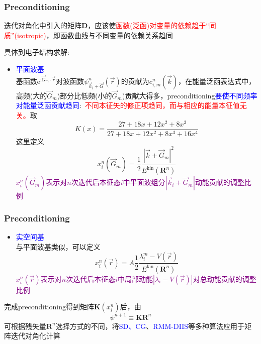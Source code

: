 \documentclass[cjk,slidestop,compress,mathserif,blue]{beamer}
\begin{document}
\frame
{
	\frametitle{\textrm{Preconditioning}}
	迭代对角化中引入的矩阵$\mathbf{D}$，应该使\textcolor{red}{函数(泛函)对变量的依赖趋于“同质”(\textrm{isotropic})}，即函数曲线与不同变量的依赖关系趋同

	具体到电子结构求解:~
	\begin{itemize}
		\item \textcolor{blue}{平面波基}\\
			基函数$\mathrm{e}^{\mathrm{i}\vec G_m\cdot\vec r}$对波函数$\psi_{\vec k_i+\vec G}^n(\vec r)$的贡献为$c_{i,m}^n(\vec k)$，在能量泛函表达式中，高频(大的$\vec G_m$)部分比低频(小的$\vec G_m$)贡献大得多，\textrm{preconditioning}\textcolor{blue}{要使不同频率对能量泛函贡献趋同}:~\textcolor{red}{不同本征矢的修正项趋同，而与相应的能量本征值无关。}取
	\begin{displaymath}
		K(x)=\dfrac{27+18x+12x^2+8x^3}{27+18x+12x^2+8x^3+16x^4}
	\end{displaymath}
	这里定义
	\begin{displaymath}
		x_i^n(\vec G_m)=\dfrac12\dfrac{|\vec k+\vec G_m|^2}{E^{\mathrm{kin}}(\mathbf{R}^n)}
	\end{displaymath}
	\textcolor{purple}{$x_i^n(\vec G_m)$表示对$n$次迭代后本征态$i$中平面波组分$|\vec k_i+\vec G_m|$动能贡献的调整比例}
	\end{itemize}
}

\frame
{
	\frametitle{\textrm{Preconditioning}}
	\begin{itemize}
		\item \textcolor{blue}{实空间基}\\
		与平面波基类似，可以定义
	\begin{displaymath}
		x_i^n(\vec r)=A\dfrac12\dfrac{\lambda_i^m-V(\vec r)}{E^{\mathrm{kin}}(\mathbf{R}^n)}
	\end{displaymath}
		\textcolor{purple}{$x_i^n(\vec r)$表示对$n$次迭代后本征态$i$中局部动能$|\lambda_i-V(\vec r)|$对总动能贡献的调整比例}
	\end{itemize}
	完成\textrm{preconditioning}得到矩阵$\mathbf{K}(x_i^n)$后，由
	\begin{displaymath}
		\psi^{n+1}\equiv\mathbf{K}\mathbf{R}^n
	\end{displaymath}
	可根据残矢量$\mathbf{R}^n$选择方式的不同，将\textcolor{blue}{\textrm{SD}、\textrm{CG}}、\textcolor{blue}{\textrm{RMM-DIIS}}等多种算法应用于矩阵迭代对角化计算
}
\end{document}

